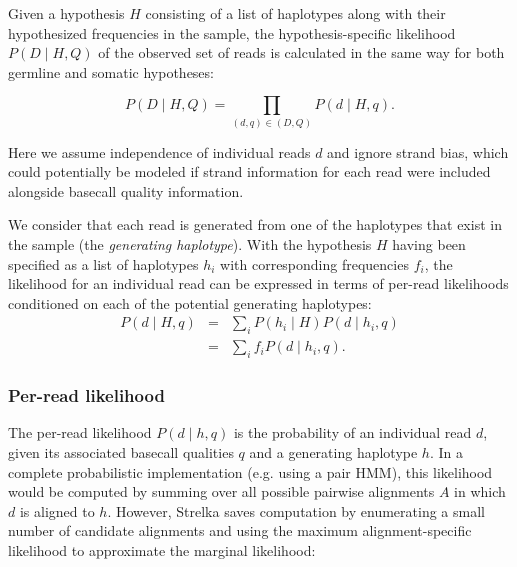 \documentclass{article}
\begin{document}
Given a hypothesis $H$ consisting of a list of haplotypes along with their hypothesized frequencies in the sample, the hypothesis-specific likelihood $P(D \mid H,Q)$ of the observed set of reads is calculated in the same way for both germline and somatic hypotheses:

\begin{equation*}
\label{eq:geno_lik}
P(D \mid H,Q) = \prod_{(d,q) \in (D,Q)} P(d \mid H,q).
\end{equation*}

Here we assume independence of individual reads $d$  and ignore strand bias, which could potentially be modeled if strand information for each read were included alongside basecall quality information.

We consider that each read is generated from one of the haplotypes that exist in the sample (the \emph{generating haplotype}). With the hypothesis $H$ having been specified as a list of haplotypes $h_i$ with corresponding frequencies $f_i$, the likelihood for an individual read can be expressed in terms of per-read likelihoods conditioned on each of the potential generating haplotypes:
\begin{eqnarray*}
P(d \mid H,q) & = & \sum_i P(h_i \mid H)P(d \mid h_i,q)\\
& = & \sum_i f_i P(d \mid h_i,q).
\end{eqnarray*}

\subsubsection{Per-read likelihood}
\label{sec:PerReadLikelihood}

The per-read likelihood $P(d \mid h,q)$ is the probability of an individual read $d$, given its associated basecall qualities $q$ and a generating haplotype $h$. In a complete probabilistic implementation (e.g. using a pair HMM), this likelihood would be computed by summing over all possible pairwise alignments $A$ in which $d$ is aligned to $h$. However, Strelka saves computation by enumerating a small number of candidate alignments and using the maximum alignment-specific likelihood to approximate the marginal likelihood:
\end{document}
